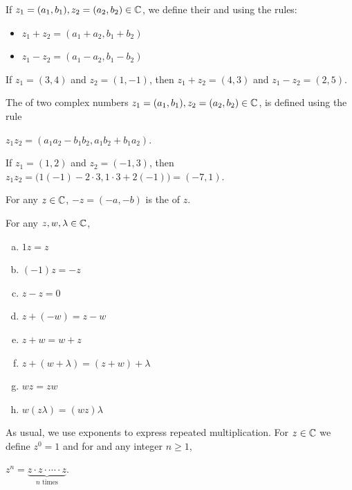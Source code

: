 \documentclass[11pt,fleqn,dvipsnames,usenames]{article}
\begin{document}
\begin{definition}
If $z_{1} = (a_{1},b_{1}), z_{2} = (a_{2},b_{2})\in\mathbb{C}$, we define their  and  using the rules:
\begin{itemize}
\item $z_{1} + z_{2} = (a_{1} + a_{2}, b_{1} + b_{2})$
\item $z_{1} - z_{2} = (a_{1} - a_{2}, b_{1} - b_{2})$
\end{itemize}
\end{definition}

\begin{example}
If $z_{1} = (3,4)$ and $z_{2} = (1,-1)$, then $z_{1} + z_{2} = (4, 3)$ and $z_{1} - z_{2} = (2,5)$.
\end{example}

\begin{definition}\label{complexmultiplication}
The  of two complex numbers $z_{1} = (a_{1},b_{1}), z_{2} = (a_{2},b_{2})\in\mathbb{C}$, is defined using the rule
\begin{center}
$z_{1}z_{2} = (a_{1}a_{2} - b_{1}b_{2}, a_{1}b_{2} + b_{1}a_{2})$.
\end{center}
\end{definition}

\begin{example}\label{examplecomplexmultiplication}
If $z_{1} = (1,2)$ and $z_{2} = (-1,3)$, then $z_{1}z_{2} = \Big(1(-1) - 2\cdot 3, 1\cdot 3 + 2(-1)\Big) = (-7,1)$.
\end{example}

\notation For any $z\in\mathbb{C}$, $-z = (-a,-b)$ is the  of $z$.
\vsp

\properties For any $z,w,\lambda\in\mathbb{C}$,
\begin{multicols}{2}
\begin{enumerate}[(a)]
\item $1z = z$
\item $(-1)z = -z$
\item $z - z = 0$
\item $z + (-w) = z - w$
\item $z + w = w + z$
\item $z + (w + \lambda) = (z + w) + \lambda$
\item $wz = zw$
\item $w(z\lambda) = (wz)\lambda$
\end{enumerate}
\end{multicols}
\vsp

\notation As usual, we use exponents to express repeated multiplication.  For $z\in\mathbb{C}$ we define $z^{0} = 1$ and for and any integer $n\geq 1$,
\begin{center}
$z^{n} = \underbrace{z\cdot z\cdot \cdots \cdot z}_{n\text{ times}}$.
\end{center}
\end{document}
